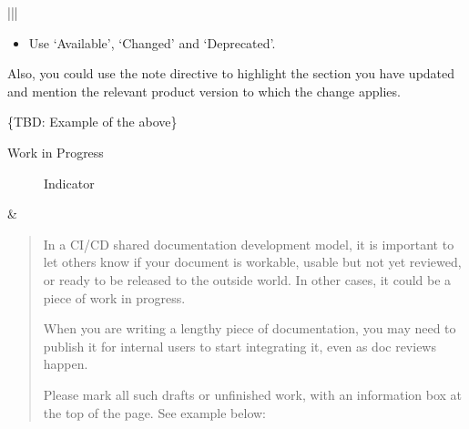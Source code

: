 \documentclass[letterpaper,10pt,english]{sphinxmanual}
\begin{document}
\begin{savenotes}
\begin{tabular}[t]{|*{2}{|}}
\begin{itemize}
\item {} 
Use ‘Available’, ‘Changed’ and ‘Deprecated’.

\end{itemize}

Also, you could use the note directive to highlight the section you have updated
and mention the relevant product version to which the change applies.

\{TBD: Example of the above\}
\\
\hline\begin{description}
\item[{Work in Progress}] \leavevmode
Indicator

\end{description}
&\begin{quote}

In a CI/CD shared documentation development model, it is important to let others
know if your document is workable, usable but not yet reviewed, or ready to be
released to the outside world. In other cases, it could be a piece of work in
progress.

When you are writing a lengthy piece of documentation, you may need to publish
it for internal users to start integrating it, even as doc reviews happen.

Please mark all such drafts or unfinished work, with an
information box at the top of the page. See example below:
\end{quote}


\end{tabular}
\end{savenotes}
\end{document}
